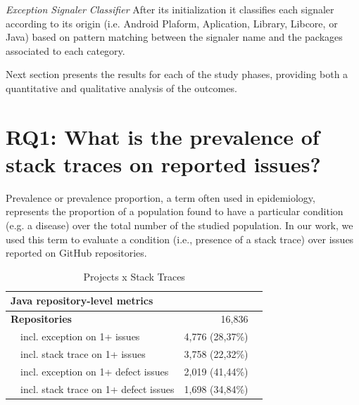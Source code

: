 \documentclass[conference]{IEEEtran}
\begin{document}
\noindent\emph{Exception Signaler Classifier} After its initialization it
classifies each signaler according to its origin (i.e. Android Plaform,
Aplication, Library, Libcore, or Java) based on pattern matching between the
signaler name and the packages associated to each category.

Next section presents the results for each of the study phases, providing both a
quantitative and qualitative analysis of the outcomes.


\section{RQ1: What is the prevalence of stack traces on reported issues?}

Prevalence or prevalence proportion, a term often used in epidemiology,
represents the proportion of a population found to have a particular condition
(e.g. a disease) over the total number of the studied population. In our work, we used
this term to evaluate a condition (i.e., presence of a stack trace) over issues
reported on GitHub repositories.



\begin{table}
\centering
\begin{tabular}{p{1em}lrr}
\hline
 \multicolumn{2}{l}{\bfseries{Java repository-level metrics}} & \\
\hline
\multicolumn{2}{l}{\bfseries{Repositories}} & 16,836\\
    & incl. exception on 1+ issues & 4,776 (28,37\%) \\
    & incl. stack trace on 1+ issues & 3,758 (22,32\%) \\
    & incl. exception on 1+ defect issues & 2,019 (41,44\%)\\
    & incl. stack trace on 1+ defect issues  & 1,698 (34,84\%) \\

\hline
\end{tabular}
\caption{Projects x Stack Traces}
\label{tab:proj}
\end{table}
\end{document}
